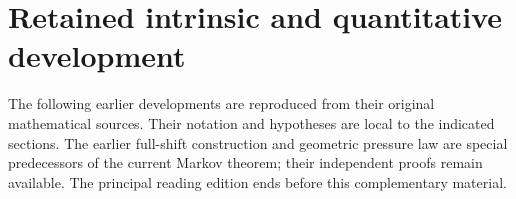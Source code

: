 
\section*{Retained intrinsic and quantitative development}
The following earlier developments are reproduced from their original
mathematical sources. Their notation and hypotheses are local to the
indicated sections. The earlier full-shift construction and geometric
pressure law are special predecessors of the current Markov theorem;
their independent proofs remain available. The principal reading
edition ends before this complementary material.







